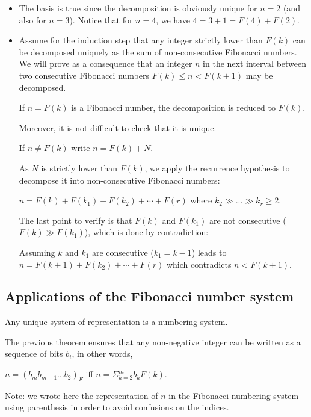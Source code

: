 \begin{itemize}
\item
The basis is true since the decomposition is obviously unique for $n=2$ (and also for $n=3$). 
Notice that for $n=4$, we have $4 = 3 + 1 = F(4) + F(2)$. 

\item
Assume for the induction step that any integer strictly lower than $F(k)$ can be decomposed uniquely as the sum of non-consecutive Fibonacci numbers.
We will prove as a consequence that an integer $n$ in the next interval between two consecutive Fibonacci numbers $F(k) \leq n < F(k+1)$ may be decomposed. 

If $n=F(k)$ is a Fibonacci number, the decomposition is reduced to $F(k)$.

Moreover, it is not difficult to check that it is unique.


\medskip

If $n \neq F(k)$ write $n = F(k) + N$.

As $N$ is strictly lower than $F(k)$, we apply the recurrence hypothesis to decompose it into non-consecutive Fibonacci numbers:

$n = F(k) + F(k_1) + F(k_2) + \cdots + F(r)$ where $k_2 \gg ... \gg k_r \geq 2$. 

The last point to verify is that $F(k)$ and $F(k_1)$ are not consecutive ($F(k) \gg F(k_1)$), which is done by contradiction:

Assuming $k$ and $k_1$ are consecutive ($k_1=k-1$) leads to $n = F(k+1) + F(k_2) + \cdots + F(r)$
which contradicts $n < F(k+1)$.
\end{itemize}


\subsection{Applications of the Fibonacci number system}

Any unique system of representation is a numbering system.

The previous theorem ensures that any non-negative integer can be written
as a sequence of bits $b_i$, in other words,

$n = (b_mb_{m-1}...b_2)_F$ iff $n = \Sigma_{k=2}^m b_k F(k)$.

Note: we wrote here the representation of $n$ in the Fibonacci numbering system using parenthesis in order to avoid confusions 
on the indices.

